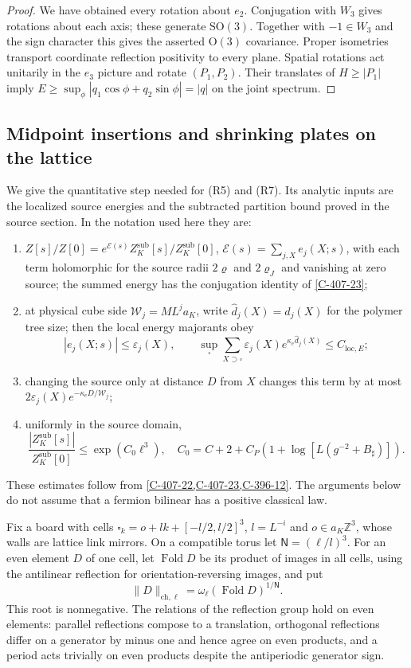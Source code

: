 \documentclass[11pt,letterpaper,reqno]{amsart}
\theoremstyle{definition}
\theoremstyle{remark}
\begin{document}
\begin{proof}
We have obtained every rotation about $e_2$.
Conjugation with $W_3$ gives rotations about each
axis; these generate $\mathrm{SO}(3)$.  Together
with $-1\in W_3$ and the sign character this gives
the asserted $\mathrm O(3)$ covariance.  Proper
isometries transport coordinate reflection positivity
to every plane.  Spatial rotations act unitarily
in the $e_3$ picture and rotate $(P_1,P_2)$.
Their translates of $H\ge|P_1|$ imply
$E\ge\sup_\phi|q_1\cos\phi+q_2\sin\phi|=|q|$
on the joint spectrum.
\end{proof}

\subsection{Midpoint insertions and shrinking plates on the lattice}

We give the quantitative step needed for (R5) and (R7).
Its analytic inputs are the localized source energies
and the subtracted partition bound proved in the
source section.  In the notation used here they are:
\begin{enumerate}
\item $Z[s]/Z[0]=e^{\mathcal E(s)}
 Z_K^{\mathrm{sub}}[s]/Z_K^{\mathrm{sub}}[0]$,
$\mathcal E(s)=\sum_{j,X}e_j(X;s)$, with each
term holomorphic for the source radii $2\varrho$
and $2\varrho_J$ and vanishing at zero source; the summed energy
has the conjugation identity of \cref{C-407-23};
\item at physical cube side $\mathscr W_j=ML^ja_K$,
write $\hat d_j(X)=d_j(X)$ for the polymer tree size;
then the local energy majorants obey
\[
 |e_j(X;s)|\le\varepsilon_j(X),\qquad
 \sup_\square\sum_{X\supset\square}
       \varepsilon_j(X)e^{\kappa_e\hat d_j(X)}
                                      \le C_{\mathrm{loc},E};
\]
\item changing the source only at distance $D$
from $X$ changes this term by at most
$2\varepsilon_j(X)e^{-\kappa_eD/\mathscr W_j}$;
\item uniformly in the source domain,
\[
 \frac{|Z_K^{\mathrm{sub}}[s]|}{Z_K^{\mathrm{sub}}[0]}
 \le\exp(C_0\ell^3),\quad
 C_0=C+2+C_P(1+\log[L(g^{-2}+B_\sharp)]).
\]
\end{enumerate}
These estimates follow from \cref{C-407-22,C-407-23,C-396-12}.  The arguments below do
not assume that a fermion bilinear has a positive
classical law.

Fix a board with cells
$\square_k=o+lk+[-l/2,l/2]^3$, $l=L^{-i}$ and
$o\in a_K\mathbb Z^3$, whose walls are lattice
link mirrors.  On a compatible torus let
$\mathsf N=(\ell/l)^3$.  For an even element $D$
of one cell, let $\operatorname{Fold}D$ be its
product of images in all cells, using the
antilinear reflection for orientation-reversing
images, and put
\[
 \|D\|_{\mathrm{ch},\ell}
       =\omega_\ell(\operatorname{Fold}D)^{1/\mathsf N}.
\]
This root is nonnegative.  The relations of the
reflection group hold on even elements: parallel
reflections compose to a translation, orthogonal
reflections differ on a generator by minus one
and hence agree on even products, and a period
acts trivially on even products despite the
antiperiodic generator sign.
\end{document}
